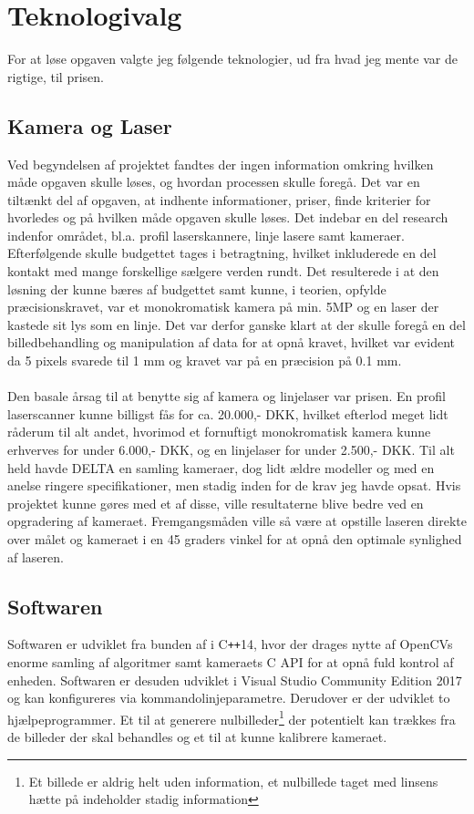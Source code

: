 \section{Teknologivalg}
For at løse opgaven valgte jeg følgende teknologier, ud fra hvad jeg mente var de rigtige, til prisen.

\newpage

\subsection{Kamera og Laser}
Ved begyndelsen af projektet fandtes der ingen information omkring hvilken måde opgaven skulle løses, og hvordan processen skulle foregå. Det var en tiltænkt del af opgaven, at indhente informationer, priser, finde kriterier for hvorledes og på hvilken måde opgaven skulle løses. Det indebar en del research indenfor området, bl.a. profil laserskannere, linje lasere samt kameraer. Efterfølgende skulle budgettet tages i betragtning, hvilket inkluderede en del kontakt med mange forskellige sælgere verden rundt. Det resulterede i at den løsning der kunne bæres af budgettet samt kunne, i teorien, opfylde præcisionskravet, var et monokromatisk kamera på min. 5MP og en laser der kastede sit lys som en linje. Det var derfor ganske klart at der skulle foregå en del billedbehandling og manipulation af data for at opnå kravet, hvilket var evident da 5 pixels svarede til 1 mm og kravet var på en præcision på 0.1 mm.\\\\
Den basale årsag til at benytte sig af kamera og linjelaser var prisen. En profil laserscanner kunne billigst fås for ca. 20.000,- DKK, hvilket efterlod meget lidt råderum til alt andet, hvorimod et fornuftigt monokromatisk kamera kunne erhverves for under 6.000,- DKK, og en linjelaser for under 2.500,- DKK. Til alt held havde DELTA en samling kameraer, dog lidt ældre modeller og med en anelse ringere specifikationer, men stadig inden for de krav jeg havde opsat. Hvis projektet kunne gøres med et af disse, ville resultaterne blive bedre ved en opgradering af kameraet.
Fremgangsmåden ville så være at opstille laseren direkte over målet og kameraet i en 45 graders vinkel for at opnå den optimale synlighed af laseren.

\subsection{Softwaren}
Softwaren er udviklet fra bunden af i C\texttt{++}14, hvor der drages nytte af OpenCVs enorme samling af algoritmer samt kameraets C API for at opnå fuld kontrol af enheden. Softwaren er desuden udviklet i Visual Studio Community Edition 2017 og kan konfigureres via kommandolinjeparametre. Derudover er der udviklet to hjælpeprogrammer. Et til at generere nulbilleder\footnote{Et billede er aldrig helt uden information, et nulbillede taget med linsens hætte på indeholder stadig information} der potentielt kan trækkes fra de billeder der skal behandles og et til at kunne kalibrere kameraet.
